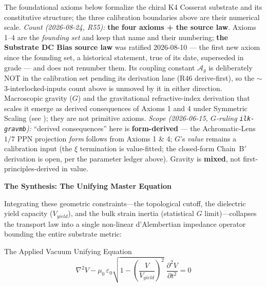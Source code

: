 \noindent The foundational axioms below formalize the chiral K4 Cosserat substrate and its constitutive structure; the three calibration boundaries above are their numerical scale. \emph{Count (2026-08-24, R55):} \textbf{the four axioms + the source law}. Axioms 1--4 are the \emph{founding set} and keep that name and their numbering; \textbf{the Substrate DC Bias source law} was ratified 2026-08-10 --- the first new axiom since the founding set, a historical statement, true of its date, superseded in grade --- and does not renumber them. Its coupling constant $\mathcal{A}_g$ is deliberately NOT in the calibration set pending its derivation lane (R46 derive-first), so the $\sim$3-interlocked-inputs count above is unmoved by it in either direction. Macroscopic gravity ($G$) and the gravitational refractive-index derivation that scales it emerge as derived consequences of Axioms 1 and 4 under Symmetric Scaling (see ); they are not primitive axioms. \emph{Scope (2026-06-15, $G$-ruling \texttt{ilk-gravmb}):} ``derived consequences'' here is \textbf{form-derived} --- the Achromatic-Lens $1/7$ PPN projection \emph{form} follows from Axioms 1 \& 4; $G$'s \emph{value} remains a calibration input (the $\xi$ termination is value-fitted; the closed-form Chain~B$'$ derivation is open, per the parameter ledger above). Gravity is \textbf{mixed}, not first-principles-derived in value.






\vspace{1.5em}
\noindent \textbf{The Synthesis: The Unifying Master Equation}

\noindent Integrating these geometric constraints---the topological cutoff, the dielectric yield capacity ($V_{yield}$), and the bulk strain inertia (statistical $G$ limit)---collapses the transport law into a single non-linear d'Alembertian impedance operator bounding the entire substrate metric:
\begin{resultbox}{The Applied Vacuum Unifying Equation}
\begin{equation}
    \nabla^2 V - \mu_0 \, \varepsilon_0 \sqrt{1 - \left(\frac{V}{V_{yield}}\right)^2} \;\frac{\partial^2 V}{\partial t^2} = 0
\end{equation}
\end{resultbox}

